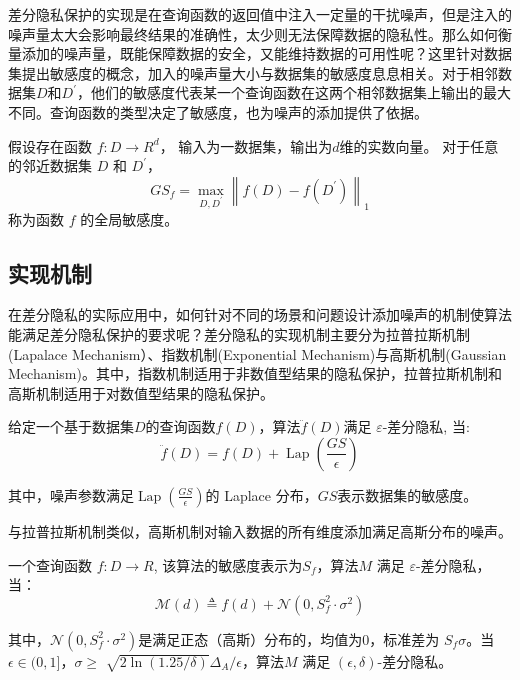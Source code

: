 差分隐私保护的实现是在查询函数的返回值中注入一定量的干扰噪声，但是注入的噪声量太大会影响最终结果的准确性，太少则无法保障数据的隐私性。那么如何衡量添加的噪声量，既能保障数据的安全，又能维持数据的可用性呢？这里针对数据集提出敏感度的概念，加入的噪声量大小与数据集的敏感度息息相关。对于相邻数据集$D$和$D^{\prime}$，他们的敏感度代表某一个查询函数在这两个相邻数据集上输出的最大不同。查询函数的类型决定了敏感度，也为噪声的添加提供了依据。

\begin{define}[全局敏感度]\label{全局敏感度}
假设存在函数 $f: D \rightarrow R^{d}$， 输入为一数据集，输出为$d$维的实数向量。 对于任意的邻近数据集 $D$ 和 $D^{\prime}$，
$$
G S_{f}=\max _{D, D^{\prime}}\left\|f(D)-f\left(D^{\prime}\right)\right\|_{1}
$$
称为函数 $f$ 的全局敏感度。
\end{define}

\subsection{实现机制}
在差分隐私的实际应用中，如何针对不同的场景和问题设计添加噪声的机制使算法能满足差分隐私保护的要求呢？差分隐私的实现机制主要分为拉普拉斯机制(Lapalace Mechanism）、指数机制(Exponential Mechanism)与高斯机制(Gaussian Mechanism)。其中，指数机制适用于非数值型结果的隐私保护，拉普拉斯机制和高斯机制适用于对数值型结果的隐私保护。

\begin{theorem}[拉普拉斯机制]\label{拉普拉斯机制}
给定一个基于数据集$D$的查询函数$f(D)$，算法$\ddot{f}(D)$满足 $\varepsilon$-差分隐私, 当:
$$
\ddot{f}(D)=f(D)+\operatorname{Lap}\left(\frac{G S}{\epsilon}\right)
$$
\end{theorem}
其中，噪声参数满足$\operatorname{Lap}\left(\frac{G S}{\epsilon}\right)$的 Laplace 分布，$GS$表示数据集的敏感度。

与拉普拉斯机制类似，高斯机制对输入数据的所有维度添加满足高斯分布的噪声。
\begin{theorem}[高斯机制]\label{高斯机制}
一个查询函数 $f: D \rightarrow R$, 该算法的敏感度表示为$S_{f}$，算法$M$ 满足 $\varepsilon$-差分隐私，当：
$$
\mathcal{M}(d) \triangleq f(d)+\mathcal{N}\left(0, S_{f}^{2} \cdot \sigma^{2}\right)
$$
\end{theorem}
其中，$\mathcal{N}\left(0, S_{f}^{2} \cdot \sigma^{2}\right)$是满足正态（高斯）分布的，均值为0，标准差为 $S_{f} \sigma$。当$\epsilon \in(0,1]$，$\sigma \geq$ $\sqrt{2 \ln (1.25 / \delta)} \Delta_{A} / \epsilon$，算法$M$ 满足 $(\epsilon, \delta)$-差分隐私。

